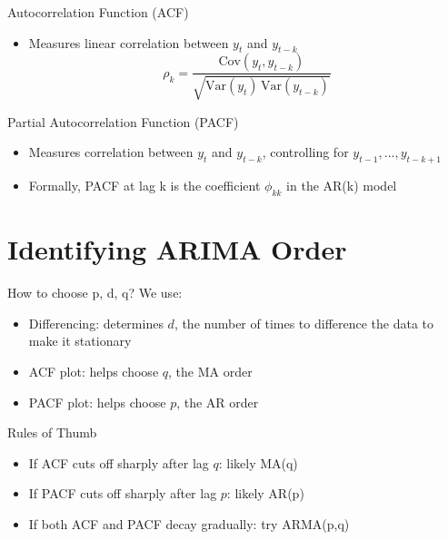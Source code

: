 \documentclass[aspectratio=169]{beamer}
\begin{document}
\begin{frame}[label={sec:org6d7a24b}]{Autocorrelation Function (ACF)}
\begin{itemize}
\item Measures linear correlation between \(y_t\) and \(y_{t-k}\)
\[
    \rho_k = \frac{\text{Cov}(y_t, y_{t-k})}{\sqrt{\text{Var}(y_t)\, \text{Var}(y_{t-k})}}
  \]
\end{itemize}
\end{frame}

\begin{frame}[label={sec:org93cd145}]{Partial Autocorrelation Function (PACF)}
\begin{itemize}
\item Measures correlation between \(y_t\) and \(y_{t-k}\), controlling for \(y_{t-1}, \ldots, y_{t-k+1}\)
\item Formally, PACF at lag k is the coefficient \(\phi_{kk}\) in the AR(k) model
\end{itemize}
\end{frame}

\section{Identifying ARIMA Order}
\label{sec:org5d5afea}

\begin{frame}[label={sec:org86c9185}]{How to choose p, d, q?}
We use:

\begin{itemize}
\item \alert{Differencing}: determines \(d\), the number of times to difference the data to make it stationary
\item \alert{ACF plot}: helps choose \(q\), the MA order
\item \alert{PACF plot}: helps choose \(p\), the AR order
\end{itemize}
\end{frame}

\begin{frame}[label={sec:org28253ba}]{Rules of Thumb}
\begin{itemize}
\item If ACF cuts off sharply after lag \(q\): likely MA(q)
\item If PACF cuts off sharply after lag \(p\): likely AR(p)
\item If both ACF and PACF decay gradually: try ARMA(p,q)
\end{itemize}
\end{frame}
\end{document}
